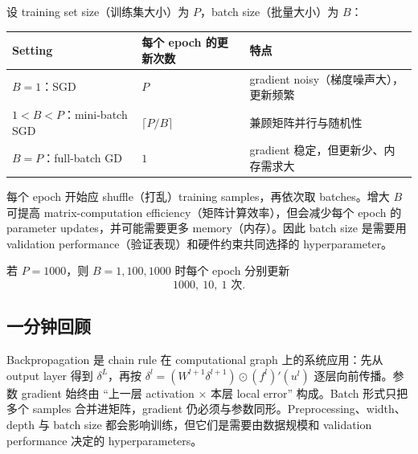 设 training set size（训练集大小）为 $P$，batch size（批量大小）为 $B$：
\begin{center}
\small
\begin{tabularx}{0.92\textwidth}{@{}lXX@{}}
  \toprule
  Setting & 每个 epoch 的更新次数 & 特点 \\
  \midrule
  $B=1$：SGD & $P$ & gradient noisy（梯度噪声大），更新频繁 \\
  $1<B<P$：mini-batch SGD & $\lceil P/B\rceil$ & 兼顾矩阵并行与随机性 \\
  $B=P$：full-batch GD & $1$ & gradient 稳定，但更新少、内存需求大 \\
  \bottomrule
\end{tabularx}
\end{center}
每个 epoch 开始应 shuffle（打乱）training samples，再依次取 batches。增大 $B$ 可提高 matrix-computation efficiency（矩阵计算效率），但会减少每个 epoch 的 parameter updates，并可能需要更多 memory（内存）。因此 batch size 是需要用 validation performance（验证表现）和硬件约束共同选择的 hyperparameter。

若 $P=1000$，则 $B=1,100,1000$ 时每个 epoch 分别更新
\[
  \boxed{1000,\ 10,\ 1\text{ 次}}.
\]

\subsection{一分钟回顾}

Backpropagation 是 chain rule 在 computational graph 上的系统应用：先从 output layer 得到 $\delta^L$，再按 $\delta^l=(W^{l+1}\delta^{l+1})\odot(f^l)'(u^l)$ 逐层向前传播。参数 gradient 始终由 ``上一层 activation $\times$ 本层 local error'' 构成。Batch 形式只把多个 samples 合并进矩阵，gradient 仍必须与参数同形。Preprocessing、width、depth 与 batch size 都会影响训练，但它们是需要由数据规模和 validation performance 决定的 hyperparameters。
